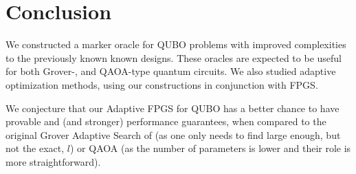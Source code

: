 \documentclass[reqno, 10pt]{amsart}
\numberwithin{equation}{section}                     %
\begin{document}

\bigskip

\section{Conclusion}
\label{sec:conclusion}

We constructed a marker oracle for QUBO problems with improved complexities to the previously known known designs. These oracles are expected to be useful for both Grover-, and QAOA-type quantum circuits. We also studied adaptive optimization methods, using our constructions in conjunction with FPGS.

We conjecture that our Adaptive FPGS for QUBO has a better chance to have provable and (and stronger) performance guarantees, when compared to the original Grover Adaptive Search of \cite{gilliam_grover_2021} (as one only needs to find large enough, but not the exact, $l$) or QAOA (as the number of parameters is lower and their role is more straightforward).

    
\end{document}
